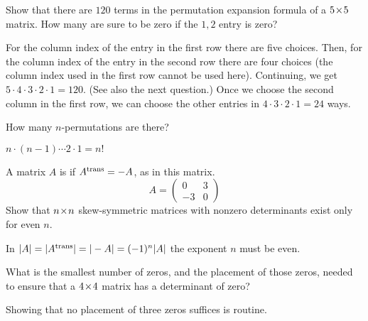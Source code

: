 \begin{exercises}
  \item 
    \begin{exparts}
      \partsitem Show that there are $120$ terms in the permutation
         expansion formula of a \( 5 \! \times \! 5 \) matrix.
      \partsitem 
         How many are sure to be zero if the \( 1,2 \) entry is zero?
    \end{exparts}
    \begin{answer}
      \begin{exparts}
        \partsitem For the column index of the entry in the first row there are
          five choices.
          Then, for the column index of the entry in the second row there
          are four choices (the column index used in the first row cannot 
          be used here).
          Continuing, we get $5\cdot 4\cdot 3\cdot 2\cdot 1=120$.
          (See also the next question.)
        \partsitem Once we choose the second column in the first row, 
          we can choose the other entries in \( 4\cdot 3\cdot 2\cdot 1=24 \) 
          ways.
      \end{exparts}  
    \end{answer}
  \item 
    How many \( n \)-permutations are there?
    \begin{answer}
       \( n\cdot(n-1)\cdots 2\cdot 1=n! \) 
    \end{answer}
  \item 
    A matrix \( A \) is 
     if \( {{A}^{\rm trans}}=-A \),
    as in this matrix.
    \begin{equation*}
      A=\begin{pmatrix}
          0  &3  \\
         -3  &0
        \end{pmatrix}
    \end{equation*}
    Show that \( n \! \times \! n \) skew-symmetric matrices with nonzero
    determinants exist only for even \( n \).
    \begin{answer}
      In 
      \( \deter{A}=\deter{\trans{A}}=\deter{-A}=(-1)^n\deter{A} \)
      the exponent $n$ must be even. 
    \end{answer}
  \recommended \item
    What is the smallest number of zeros, and the placement of
    those zeros, needed to ensure that a \( 4 \! \times \! 4 \) matrix has a
    determinant of zero?
    \begin{answer}
      Showing that no placement of three zeros suffices is routine.

\end{answer}
\end{exercises}
